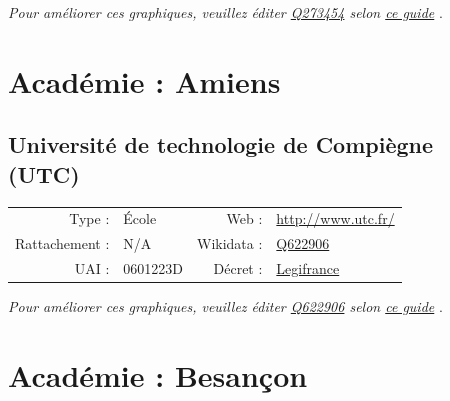 \documentclass[11pt,french,landscape]{article}
\begin{document}
\textit{\scriptsize Pour améliorer ces graphiques, veuillez éditer \href{https://www.wikidata.org/entity/Q273454}{Q273454}  selon \href{https://github.com/cpesr/wikidataESR/blob/master/Rmd/wikidataESR.md}{ce guide}}
.


\newpage

\hypertarget{acaduxe9mie-amiens-1}{%
\section{Académie : Amiens}\label{acaduxe9mie-amiens-1}}

\hypertarget{universituxe9-de-technologie-de-compiuxe8gne-utc}{%
\subsection{Université de technologie de Compiègne
(UTC)}\label{universituxe9-de-technologie-de-compiuxe8gne-utc}}

\begin{tabular*}{0.45\textwidth}{rp{2cm}rl}  
\hline  
Type : & École & Web : &\href{http://www.utc.fr/}{http://www.utc.fr/} \\  
Rattachement : & N/A & Wikidata : & \href{https://www.wikidata.org/entity/Q622906}{Q622906} \\  
UAI : & 0601223D & Décret : & \href{http://www.legifrance.gouv.fr/affichTexte.do?dateTexte=&categorieLien=id&cidTexte=JORFTEXT000000699822&fastPos=1&fastReqId=1104423477&oldAction=rechExpTexteJorf}{Legifrance} \\  
\hline  
\end{tabular*}

\textit{\scriptsize Pour améliorer ces graphiques, veuillez éditer \href{https://www.wikidata.org/entity/Q622906}{Q622906}  selon \href{https://github.com/cpesr/wikidataESR/blob/master/Rmd/wikidataESR.md}{ce guide}}
.


\newpage

\hypertarget{acaduxe9mie-besanuxe7on-1}{%
\section{Académie : Besançon}\label{acaduxe9mie-besanuxe7on-1}}
\end{document}
